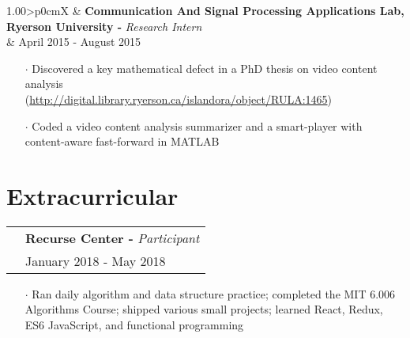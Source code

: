 \documentclass[a4paper, oneside, final]{scrartcl} %
\newcommand{\gray}{\rowcolor[gray]{.90}} %
\begin{document}
\begin{center}
\begin{itemize}
  \end{itemize}

  \vspace{-0.05cm}

  \begin{tabularx}{1.00\linewidth}{>{\raggedleft\scshape}p{0cm}X}
    \gray& \textbf{Communication And Signal Processing Applications Lab, Ryerson University -} \textit{Research Intern}\\
    \gray& {April 2015 - August 2015}\\
  \end{tabularx}
  \vspace{-0.2cm}
  \begin{itemize}\itemsep-0.2cm
      \vspace{-0.1cm}

    \item[$\cdot$] Discovered a key mathematical defect in a PhD thesis on video content analysis \\(\url{http://digital.library.ryerson.ca/islandora/object/RULA:1465})\\
    \item[$\cdot$] Coded a video content analysis summarizer and a smart-player with content-aware fast-forward in MATLAB\\

  \end{itemize}

  \section{Extracurricular}
  \renewcommand{\arraystretch}{1.3}
  \vspace{-0.05cm}

  \begin{tabularx}{1.00\linewidth}{>{\raggedleft\scshape}p{0cm}X}
    \gray& \textbf{Recurse Center -} \textit{Participant}\\
    \gray& {January 2018 - May 2018}\\
  \end{tabularx}
  \vspace{-0.2cm}
  \begin{itemize} \itemsep-0.2cm
      \vspace{-0.1cm}

    \item[$\cdot$] Ran daily algorithm and data structure practice; completed the MIT 6.006 Algorithms Course; shipped various small projects; learned React, Redux, ES6 JavaScript, and functional programming
  \end{itemize}


\end{center}
\end{document}
